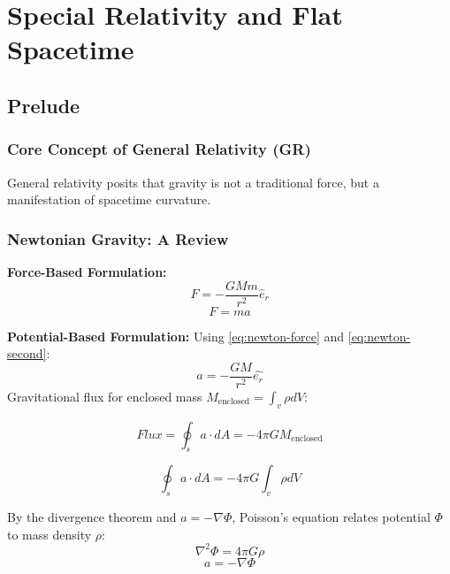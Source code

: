 \documentclass[11pt, a4paper]{report}
\begin{document}
\newpage
\tableofcontents
\newpage

\newcommand{\eqn}[1]{\hyperref[#1]{\eqref{#1}}}

\chapter{Special Relativity and Flat Spacetime}

\section{Prelude}

\subsection*{Core Concept of General Relativity (GR)}
General relativity posits that gravity is not a traditional force, but a manifestation of spacetime curvature.

\subsection*{Newtonian Gravity: A Review}
\textbf{Force-Based Formulation:}
\begin{equation}\label{eq:newton-force}
F = - \frac{GMm}{r^2} \hat{e}_r
\end{equation}
\begin{equation}\label{eq:newton-second}
F = ma
\end{equation}

\textbf{Potential-Based Formulation:}
Using \eqn{eq:newton-force} and \eqn{eq:newton-second}:
\begin{equation}
a = -\frac{GM}{r^2} \hat{e_r}
\end{equation}
Gravitational flux for enclosed mass $M_{\text{enclosed}} = \int_v \rho dV$:


$$Flux  = \oint_s a \cdot dA = - 4 \pi G M_{\text{enclosed}}$$

$$\oint_s a \cdot dA = - 4 \pi G \int_v \rho dV$$


By the divergence theorem and $a = - \nabla \Phi$, Poisson's equation relates potential $\Phi$ to mass density $\rho$:
\begin{equation}\label{eq:poisson}
\nabla^2 \Phi = 4\pi G \rho
\end{equation}
\begin{equation}\label{eq:potential-accel}
a = -\nabla \Phi
\end{equation}
\end{document}
